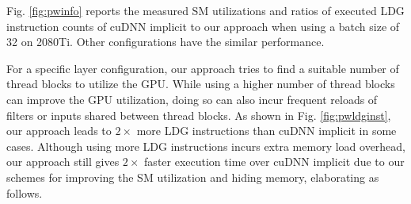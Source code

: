 Fig. \ref{fig:pwinfo} reports the measured SM utilizations and ratios of executed LDG instruction counts of cuDNN implicit to our approach when using a batch size of 32 on 2080Ti. Other configurations have the similar performance.


For a specific layer configuration, our approach tries to find a suitable number of thread blocks to utilize the GPU. While using a higher
number of thread blocks can improve the GPU utilization, doing so can also incur frequent reloads of filters or inputs shared between
thread blocks. As shown in Fig. \ref{fig:pwldginst}, our approach leads to $2\times$ more LDG instructions than cuDNN implicit in some
cases. Although using more LDG instructions incurs extra memory load overhead, our approach still gives $2\times$ faster execution time
over cuDNN implicit due to our schemes for improving the SM utilization and hiding memory, elaborating as follows.


